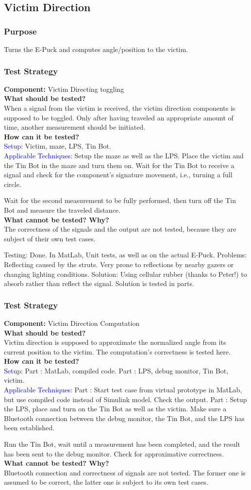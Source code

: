 \documentclass[a4paper,parskip,headheight=38pt]{scrartcl} %
\newcommand*{\rom}[1]{\uppercase\expandafter{\romannumeral #1\relax}}
\newcommand{\teststrat}[5]{
    \subsubsection{Test Strategy}
	\textbf{Component:} #1 \\
	\noindent\textbf{What should be tested?} \\
    \noindent #2 \\
	\noindent\textbf{How can it be tested?} \\
    \noindent\textcolor{blue}{Setup:} #3 \\
    \noindent\textcolor{blue}{Applicable Techniques:} #4 \\
	\noindent\textbf{What cannot be tested? Why?} \\
    \noindent #5
}
\newcommand{\ie}{i.e.}
\begin{document}
\subsection{Victim Direction}
\subsubsection{Purpose}
Turns the E-Puck and computes angle/position to the victim.
\teststrat{Victim Directing toggling}{
    When a signal from the victim is received, the victim direction components
    is supposed to be toggled. Only after having traveled an appropriate amount
    of time, another measurement should be initiated.
}{
    Victim, maze, LPS, Tin Bot.
}{
    Setup the maze as well as the LPS. Place the victim and the
    Tin Bot in the
    maze and turn them on. Wait for the Tin Bot to receive a signal and check
    for the component's signature movement, \ie, turning a full circle.

    Wait for the second measurement to be fully performed, then turn off the Tin
    Bot and measure the traveled distance.
}{
    The correctness of the signals and the output are not tested, because they
    are subject of their own test cases.
}
Testing: Done. In MatLab, Unit tests, as well as on the actual E-Puck. Problems: Reflecting caused by the struts. Very prone to reflections by nearby gazers or changing lighting conditions. Solution: Using cellular rubber (thanks to Peter!) to absorb rather than reflect the signal. Solution is tested in parts.

\teststrat{Victim Direction Computation}{
    Victim direction is supposed to approximate the normalized angle from its
    current position to the victim. The computation's correctness is tested
    here.
}{
    Part \rom{1}: MatLab, compiled code.
    Part \rom{2}: LPS, debug monitor, Tin Bot, victim.
}{
    Part \rom{1}: Start test case from virtual prototype in MatLab, but use
    compiled code
    instead of Simulink model. Check the output.
    Part \rom{2}: Setup the LPS, place and turn on the Tin Bot as well as the
    victim. Make sure a Bluetooth connection between the debug monitor, the Tin
    Bot, and the LPS has been established. 

    Run the Tin Bot, wait until a measurement has been completed, and the result
    has been sent to the debug monitor. Check for approximative correctness.
}{
    Bluetooth connection and correctness of signals are not tested. The former
    one is assumed to be correct, the latter one is subject to its own test
    cases.
}
\end{document}
